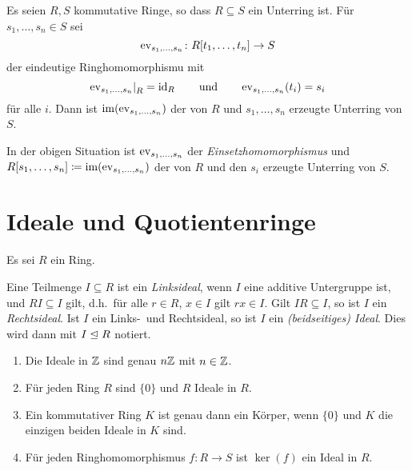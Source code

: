 \begin{lemma}
  \label{lemma: constructed of generated subring}
  Es seien $R, S$ kommutative Ringe, so dass $R \subseteq S$ ein Unterring ist.
  Für $s_1, \dotsc, s_n \in S$ sei
  \[
            \operatorname{ev}_{s_1, \dotsc, s_n}
    \colon  R[t_1, \dotsc, t_n]
    \to     S
  \]
  der eindeutige Ringhomomorphismu mit
  \[
      \restrict{\eval_{s_1, \dotsc, s_n}}{R}
    = \id_R
    \qquad\text{und}\qquad
      \eval_{s_1, \dotsc, s_n}(t_i)
    = s_i
  \]
  für alle $i$.
  Dann ist $\operatorname{im}(\operatorname{ev}_{s_1, \dotsc, s_n})$ der von $R$ und $s_1, \dotsc, s_n$ erzeugte Unterring von $S$.
\end{lemma}

\begin{definition}
  In der obigen Situation ist $\operatorname{ev}_{s_1, \dotsc, s_n}$ der \emph{Einsetzhomomorphismus} und $R[s_1, \dotsc, s_n] \coloneqq \operatorname{im}(\operatorname{ev}_{s_1, \dotsc, s_n})$ der von $R$ und den $s_i$ erzeugte Unterring von $S$.
\end{definition}



\section{Ideale und Quotientenringe}

Es sei $R$ ein Ring.

\begin{definition}
  Eine Teilmenge $I \subseteq R$ ist ein \emph{Linksideal}, wenn $I$ eine additive Untergruppe ist, und $RI \subseteq I$ gilt, d.h.\ für alle $r \in R$, $x \in I$ gilt $rx \in I$.
  Gilt $IR \subseteq I$, so ist $I$ ein \emph{Rechtsideal}.
  Ist $I$ ein Links-\ und Rechtsideal, so ist $I$ ein \emph{\textup(beidseitiges\textup) Ideal}.
  Dies wird dann mit $I \mathrel{\trianglelefteq} R$ notiert.
\end{definition}

\begin{example}
  \begin{enumerate}
    \item
      Die Ideale in $\mathbb{Z}$ sind genau $n\mathbb{Z}$ mit $n \in \mathbb{Z}$.
    \item
      Für jeden Ring $R$ sind $\{0\}$ und $R$ Ideale in $R$.
    \item
      Ein kommutativer Ring $K$ ist genau dann ein Körper, wenn $\{0\}$ und $K$ die einzigen beiden Ideale in $K$ sind.
    \item
      Für jeden Ringhomomorphismus $f \colon R \to S$ ist $\ker(f)$ ein Ideal in $R$.
  \end{enumerate}
\end{example}

